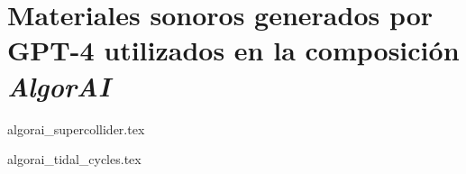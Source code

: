 \chapter{Materiales sonoros generados por GPT-4 utilizados en la composición \emph{AlgorAI}}
\label{anexo:algorai}

{algorai_supercollider.tex}

{algorai_tidal_cycles.tex}

